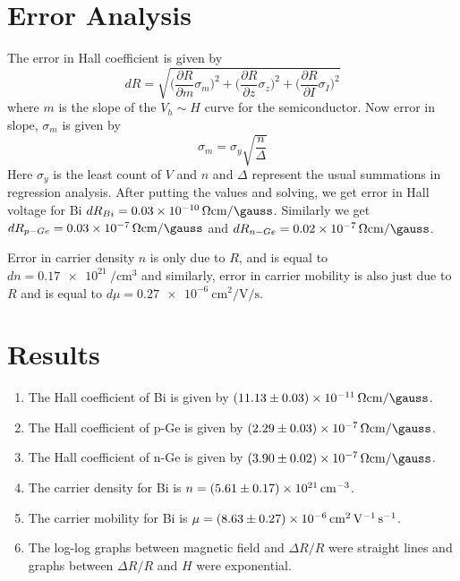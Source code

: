 \documentclass[%
 aip,
 amsmath,amssymb,
 reprint,%
]{revtex4-1}
\begin{document}
\section{Error Analysis}
The error in Hall coefficient is given by
\begin{equation}
    d R = \sqrt{\Big(\dfrac{\partial R}{\partial m} \sigma_{m}\Big)^2 + \Big(\dfrac{\partial R}{\partial z} \sigma_{z}\Big)^2 + \Big(\dfrac{\partial R}{\partial I} \sigma_{I}\Big)^2}
\end{equation}
where $m$ is the slope of the $V_h \sim H$ curve for the semiconductor.
Now error in slope, $\sigma_m$ is given by
\begin{equation}
    \sigma_m = \sigma_y \sqrt{\dfrac{n}{\Delta}}
\end{equation}
Here $\sigma_y$ is the least count of $V$ and $n$ and $\Delta$ represent the usual summations in regression analysis.
After putting the values and solving, we get error in Hall voltage for Bi $d R_{Bi} = \SI{0.03e-10}{\ohm \centi \metre \per \gauss}$. Similarly we get $d R_{p-Ge} = \SI{0.03e-7}{\ohm \centi \metre \per \gauss}$ and $d R_{n-Ge} = \SI{0.02e-7}{\ohm \centi \metre \per \gauss}$.
\par
Error in carrier density $n$ is only due to $R$, and is equal to $dn = \SI{0.17e21}{\per \centi \metre \cubed}$ and similarly, error in carrier mobility is also just due to $R$ and is equal to $d \mu = \SI{0.27e-6}{\centi \metre \squared \per \volt \per \second}$.



\section{Results}
\begin{enumerate}
    \item The Hall coefficient of Bi is given by $\SI[separate-uncertainty=true]{11.13 \pm 0.03e-11}{\ohm \centi \metre \per \gauss}$.
    \item The Hall coefficient of p-Ge is given by $\SI[separate-uncertainty=true]{2.29 \pm 0.03e-7}{\ohm \centi \metre \per \gauss}$.
    \item The Hall coefficient of n-Ge is given by $\SI[separate-uncertainty=true]{3.90 \pm 0.02e-7}{\ohm \centi \metre \per \gauss}$.
    \item The carrier density for Bi is $n = \SI[separate-uncertainty=true]{5.61 \pm 0.17e21}{\per \centi \metre \cubed}$.
    \item The carrier mobility for Bi  is $\mu = \SI[separate-uncertainty=true]{8.63 \pm 0.27e-6}{\centi \metre \squared \per \volt \per \second}$.
    \item The log-log graphs between magnetic field and $\Delta R/R$ were straight lines and graphs between $\Delta R/R$ and $H$ were exponential.
\end{enumerate}
\end{document}
